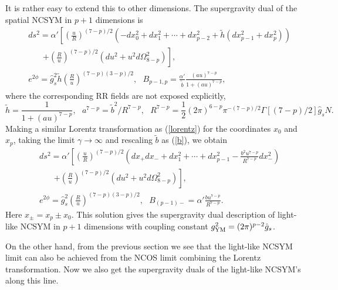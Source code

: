 \documentclass[a4paper,12pt]{article}
\begin{document}
It is rather easy to extend this to other dimensions. The supergravity dual
of the spatial NCSYM in $p+1$ dimensions is~\cite{CO}
\begin{eqnarray}
&& ds^2=\alpha'\left [\left(\frac{u}{R}\right)^{(7-p)/2}\left (-
  dx_0^2 +dx_1^2 +\cdots +dx_{p-2}^2
  +\tilde{h}(dx_{p-1}^2 +dx_p^2)\right)
   \right. \nonumber \\
&&~~~~~~~~\left. +\left(\frac{R}{u}\right)^{(7-p)/2}
    \left(du^2
 +u^2 d\Omega^2_{8-p}\right)\right], \nonumber\\
\label{ncsymdual}
&& e^{2\phi} = \hat{g}_s^2 \tilde{h}\left(\frac{R}{u}
 \right)^{(7-p)(3-p)/2}, \ \ \ B_{p-1,p}
 = \frac{\alpha'}{\tilde{b}}\frac{(au)^{7-p}}{1+(au)^{7-p}},
\end{eqnarray}
where the corresponding RR fields are not exposed explicitly,
\begin{equation}
 \tilde{h} = \frac{1} {1+(au)^{7-p}}, \ \ \ a^{7-p} = \tilde{b}^2/R^{7-p},
\ \ \ R^{7-p} = \frac{1}{2}(2\pi)^{6-p}\pi^{-(7-p)/2}\Gamma[(7-p)/2]
 \hat{g}_s N.
\end{equation}
Making a similar Lorentz transformation as (\ref{lorentz}) for the
coordinates $x_0$ and $x_{p}$, taking the limit $\gamma \to \infty$
 and rescaling $\tilde{b}$ as (\ref{b}), we obtain
\begin{eqnarray}
&& ds^2=\alpha'\left [\left(\frac{u}{R}\right)^{(7-p)/2}\left (
  dx_+dx_- +dx_1^2 +\cdots +dx_{p-1}^2
 -\frac{b^2 u^{7-p}}{R^{7-p}}dx_-^2 \right)
\right. \nonumber \\
&&~~~~~~~~\left. +\left(\frac{R}{u}\right)^{(7-p)/2}
    \left(du^2
 +u^2 d\Omega^2_{8-p}\right)\right], \nonumber\\
&& e^{2\phi} = \hat{g}_s^2 \left(\frac{R}{u}
 \right)^{(7-p)(3-p)/2}, \ \ \ B_{(p-1)-}
 =\alpha'\frac{b u^{7-p}}{R^{7-p}}.
\end{eqnarray}
Here $x_{\pm}= x_p \pm x_0$. This solution
gives the supergravity dual description of light-like NCSYM in $p+1$
dimensions with coupling constant $g^2_{\rm YM}=(2\pi)^{p-2}\hat{g}_s$.

On the other hand, from the previous section we see that the light-like
NCSYM limit can also be achieved from the NCOS limit combining
the Lorentz transformation. Now we also get the supergravity duals of
the light-like NCSYM's along this line.
\end{document}

